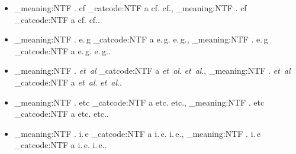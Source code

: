 \documentclass{scrartcl}
\makeatletter
\newcommand\latinabbrev[1]{
  \peek_meaning:NTF . {%
    #1\@}%
  { \peek_catcode:NTF a {%
      #1.\@ }%
    {#1.\@}}}
\def\cf/{\latinabbrev{cf}}
\def\eg/{\latinabbrev{e.\,g}}
\def\etal/{\latinabbrev{\textit{et~al}}}
\def\etc/{\latinabbrev{etc}}
\def\ie/{\latinabbrev{i.\,e}}
\makeatother
\begin{document}
\begin{itemize}
	\item \cf/, \cf/.
	\item \eg/, \eg/.
	\item \etal/, \etal/.
	\item \etc/, \etc/.
	\item \ie/, \ie/.
\end{itemize}
\end{document}
